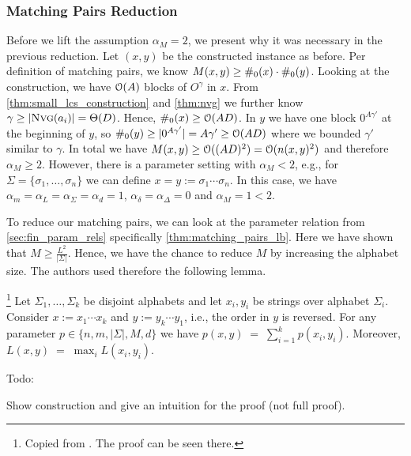 \subsubsection{Matching Pairs Reduction}

Before we lift the assumption $\alpha_M = 2$, we present why it was necessary in the previous reduction.
Let $(x,y)$ be the constructed \lcs{} instance as before.
Per definition of matching pairs, we know $M(x,y) \geq \#_{0}(x) \cdot \#_{0}(y)$.
Looking at the construction, we have $\mathcal{O}(A)$ blocks of $O^\gamma$ in $x$.
From \autoref{thm:small_lcs_construction} and \autoref{thm:nvg} we further know $\gamma \geq |\text{\textsc{Nvg}}(a_i)| = \Theta(D)$. 
Hence, $\#_{0}(x) \geq \mathcal{O}(AD)$.
In $y$ we have one block $0^{A\gamma'}$ at the beginning of $y$, so $\#_{0}(y) \geq |0^{A\gamma'}| = A\gamma' \geq \mathcal{O}(AD)$ where we bounded $\gamma'$ similar to $\gamma$.
In total we have $M(x,y) \geq \mathcal{O}((AD)^2) = \mathcal{O}(n(x,y)^2)$ and therefore $\alpha_M \geq 2$.
However, there is a parameter setting with $\alpha_M < 2$, e.g., for $\Sigma = \{ \sigma_1, \ldots, \sigma_n \}$ we can define $x = y := \sigma_1 \cdots \sigma_n$.
In this case, we have $\alpha_m = \alpha_L = \alpha_\Sigma = \alpha_d = 1$, $\alpha_\delta = \alpha_\Delta = 0$ and $\alpha_M = 1 < 2$.


To reduce our matching pairs, we can look at the parameter relation from \autoref{sec:fin_param_rels} specifically \autoref{thm:matching_pairs_lb}.
Here we have shown that $M \geq \frac{L^2}{|\Sigma|}$.
Hence, we have the chance to reduce $M$ by increasing the alphabet size.
The authors used therefore the following lemma.

\begin{lemma}
\footnote{Copied from \cite[Lemma 9.3]{Bringman.2018}. The proof can be seen there.}
Let $\Sigma_1,\ldots,\Sigma_k$ be disjoint alphabets and let $x_i,y_i$ be strings
over alphabet $\Sigma_i$. Consider $x := x_1 \cdots x_k$ and $y := y_k \cdots y_1$,
i.e., the order in $y$ is reversed. For any parameter $p \in \{n,m,|\Sigma|,M,d\}$
we have
\(
  p(x,y) \;=\; \sum_{i=1}^k p(x_i,y_i).
\)
Moreover,
\(
  L(x,y) \;=\; \max_i L(x_i,y_i).
\)
\end{lemma}


Todo:

Show construction and give an intuition for the proof (not full proof).